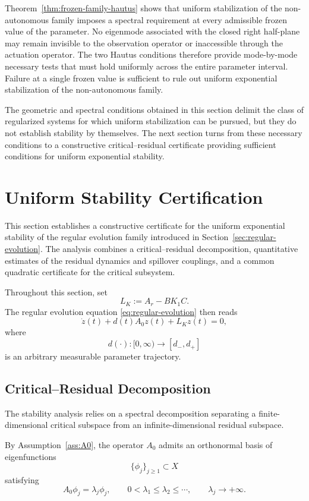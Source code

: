 \documentclass[pdflatex,sn-mathphys-num]{sn-jnl}
\theoremstyle{thmstyleone}%
\theoremstyle{thmstyletwo}%
\theoremstyle{thmstylethree}%
\begin{document}
Theorem~\ref{thm:frozen-family-hautus} shows that uniform stabilization of the non-autonomous family imposes a spectral requirement at every admissible frozen value of the parameter. No eigenmode associated with the closed right half-plane may remain invisible to the observation operator or inaccessible through the actuation operator. The two Hautus conditions therefore provide mode-by-mode necessary tests that must hold uniformly across the entire parameter interval. Failure at a single frozen value is sufficient to rule out uniform exponential stabilization of the non-autonomous family.


The geometric and spectral conditions obtained in this section delimit the class of regularized systems for which uniform stabilization can be pursued, but they do not establish stability by themselves. The next section turns from these necessary conditions to a constructive critical--residual certificate providing sufficient conditions for uniform exponential stability.

\section{Uniform Stability Certification}
\label{sec:critical-residual}

This section establishes a constructive certificate for the uniform exponential stability of the regular evolution family introduced in Section~\ref{sec:regular-evolution}. The analysis combines a
critical--residual decomposition, quantitative estimates of the residual dynamics and spillover couplings, and a common quadratic certificate for the critical subsystem.

Throughout this section, set
\[
L_K:=A_r-BK_1C.
\]
The regular evolution equation
\eqref{eq:regular-evolution}
then reads
\[
\dot z(t)
+
d(t)A_0z(t)
+
L_Kz(t)
=
0,
\]
where
\[
d(\cdot):[0,\infty)\rightarrow[d_-,d_+]
\]
is an arbitrary measurable parameter trajectory.

\subsection{Critical--Residual Decomposition}
\label{subsec:critical-decomposition}

The stability analysis relies on a spectral decomposition separating a finite-dimensional critical subspace from an infinite-dimensional residual subspace.

By Assumption~\ref{ass:A0}, the operator \(A_0\) admits an orthonormal basis of eigenfunctions
\[
\{\phi_j\}_{j\ge1}\subset X
\]
satisfying
\[
A_0\phi_j=\lambda_j\phi_j,
\qquad
0<\lambda_1\le\lambda_2\le\cdots,
\qquad
\lambda_j\rightarrow+\infty.
\]
\end{document}
